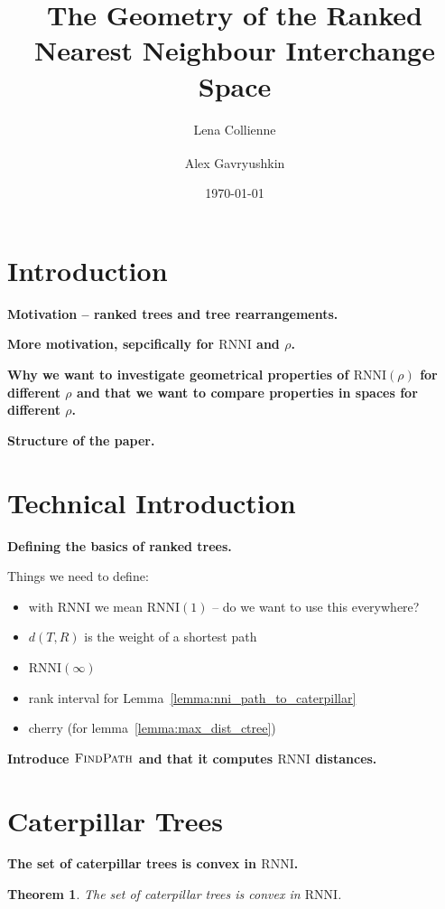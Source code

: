 \documentclass[11pt]{amsart}
\title[Geometry of ranked tree spaces]{The Geometry of the Ranked Nearest Neighbour Interchange Space}
\date{\today}
\author{Lena Collienne}
\author{Alex Gavryushkin\textsuperscript{\Letter}}
\newtheorem{theorem}{Theorem}
\newcommand{\rnni}{\mathrm{RNNI}}
\newcommand{\findpath}{\textsc{FindPath}}
\newcommand{\summary}[1]{\textbf{#1}} %
\begin{document}
\begin{abstract}
\end{abstract}

\maketitle


\section{Introduction}

\summary{Motivation -- ranked trees and tree rearrangements.}

\summary{More motivation, sepcifically for $\rnni$ and $\rho$.}

\summary{Why we want to investigate geometrical properties of $\rnni(\rho)$ for different $\rho$ and that we want to compare properties in spaces for different $\rho$.}

\summary{Structure of the paper.}


\section{Technical Introduction}

\summary{Defining the basics of ranked trees.}

Things we need to define:
\begin{itemize}
	\item with $\rnni$ we mean $\rnni(1)$ -- do we want to use this everywhere?
	\item $d(T,R)$ is the weight of a shortest path
	\item $\rnni(\infty)$
	\item rank interval for Lemma~\ref{lemma:nni_path_to_caterpillar}
	\item cherry (for lemma~\ref{lemma:max_dist_ctree})
\end{itemize}

\summary{Introduce $\findpath$ and that it computes $\rnni$ distances.}


\section{Caterpillar Trees}

\summary{The set of caterpillar trees is convex in $\rnni$.}
\begin{theorem}
	The set of caterpillar trees is convex in $\rnni$.
\end{theorem}
\end{document}
